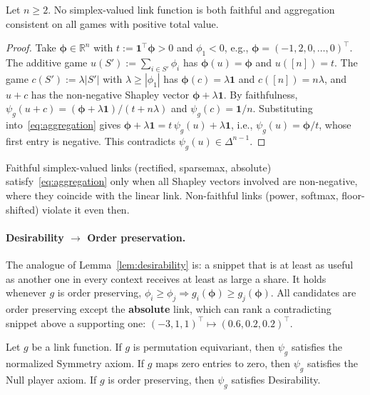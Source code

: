 \begin{proposition}\label{prop:link_impossibility}
Let $n \ge 2$. No simplex-valued link function is both faithful and aggregation consistent on all games with positive total value.
\end{proposition}

\begin{proof}
Take $\boldsymbol{\phi} \in \mathbb{R}^n$ with $t := \mathbf{1}^\top \boldsymbol{\phi} > 0$ and $\phi_1 < 0$, e.g., $\boldsymbol{\phi} = (-1, 2, 0, \dots, 0)^\top$. The additive game $u(S') := \sum_{i \in S'} \phi_i$ has $\boldsymbol{\phi}(u) = \boldsymbol{\phi}$ and $u([n]) = t$. The game $c(S') := \lambda |S'|$ with $\lambda \ge |\phi_1|$ has $\boldsymbol{\phi}(c) = \lambda \mathbf{1}$ and $c([n]) = n\lambda$, and $u + c$ has the non-negative Shapley vector $\boldsymbol{\phi} + \lambda \mathbf{1}$. By faithfulness, $\psi_g(u + c) = (\boldsymbol{\phi} + \lambda \mathbf{1})/(t + n\lambda)$ and $\psi_g(c) = \mathbf{1}/n$. Substituting into~\eqref{eq:aggregation} gives $\boldsymbol{\phi} + \lambda\mathbf{1} = t\, \psi_g(u) + \lambda \mathbf{1}$, i.e., $\psi_g(u) = \boldsymbol{\phi}/t$, whose first entry is negative. This contradicts $\psi_g(u) \in \Delta^{n-1}$.
\end{proof}

Faithful simplex-valued links (rectified, sparsemax, absolute) satisfy~\eqref{eq:aggregation} only when all Shapley vectors involved are non-negative, where they coincide with the linear link. Non-faithful links (power, softmax, floor-shifted) violate it even then.

\paragraph{Desirability $\to$ Order preservation.}
The analogue of Lemma~\ref{lem:desirability} is: a snippet that is at least as useful as another one in every context receives at least as large a share. It holds whenever $g$ is order preserving, $\phi_i \ge \phi_j \Rightarrow g_i(\boldsymbol{\phi}) \ge g_j(\boldsymbol{\phi})$. All candidates are order preserving except the \textbf{absolute} link, which can rank a contradicting snippet above a supporting one: $(-3, 1, 1)^\top \mapsto (0.6, 0.2, 0.2)^\top$.

\begin{proposition}\label{prop:axiom_transfer}
Let $g$ be a link function. If $g$ is permutation equivariant, then $\psi_g$ satisfies the normalized Symmetry axiom. If $g$ maps zero entries to zero, then $\psi_g$ satisfies the Null player axiom. If $g$ is order preserving, then $\psi_g$ satisfies Desirability.
\end{proposition}

